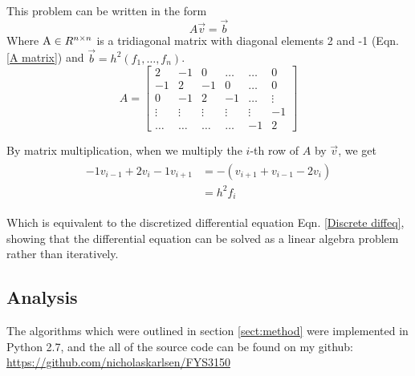 \documentclass[11pt,a4paper, twocolumn]{article}
\begin{document}
  This problem can be written in the form 
  \begin{equation}
    A\vec v = \vec b
  \end{equation}
  Where $\textup A \in R^{n \times n}$ is a tridiagonal matrix with diagonal elements 2 and -1 (Eqn. \ref{A matrix}) and $\vec b =h^2(f_1, \dots, f_n)$.
  \begin{equation}
    \label{A matrix}
    A = \left[ 
    \begin{matrix}
      2 & -1 & 0 & \dots  & \dots &0 \\
      -1 & 2 & -1 & 0 & \dots &  0 \\
      0 & -1 & 2 & -1 & \dots & \vdots  \\
      \vdots & \vdots & \vdots & \vdots & \vdots & -1\\
      \dots & \dots & \dots & \dots & -1 & 2
    \end{matrix}
    \right]
  \end{equation}

  By matrix multiplication, when we multiply   the $i$-th row of $A$ by $\vec v$, we get
  \begin{align}
  \begin{split}
 -1 v_{i -1} + 2v_i - 1v_{i+1}  &= -\left( v_{i+1} + v_{i-1} - 2v_i\right) 
                                \\&= h^2f_i
  \end{split}
  \end{align}

  Which is equivalent to the discretized differential equation Eqn. \ref{Discrete diffeq},
  showing that the differential equation can be solved as a linear algebra problem rather than iteratively.

  \subsection{Analysis}
    The algorithms which were outlined in section \ref{sect:method} were implemented in Python 2.7, and the all of the source code can be found on my github: \url{https://github.com/nicholaskarlsen/FYS3150}
\end{document}

